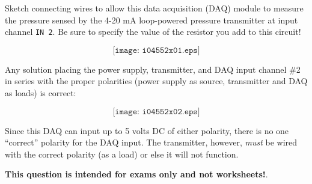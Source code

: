 

Sketch connecting wires to allow this data acquisition (DAQ) module to measure the pressure sensed by the 4-20 mA loop-powered pressure transmitter at input channel {\tt IN 2}.  Be sure to specify the value of the resistor you add to this circuit!

\vskip 50pt

$$\texttt{[image: i04552x01.eps]}$$







Any solution placing the power supply, transmitter, and DAQ input channel \#2 in series with the proper polarities (power supply as source, transmitter and DAQ as loads) is correct:

$$\texttt{[image: i04552x02.eps]}$$

Since this DAQ can input up to 5 volts DC of either polarity, there is no one ``correct'' polarity for the DAQ input.  The transmitter, however, {\it must} be wired with the correct polarity (as a load) or else it will not function.







{\bf This question is intended for exams only and not worksheets!}.


